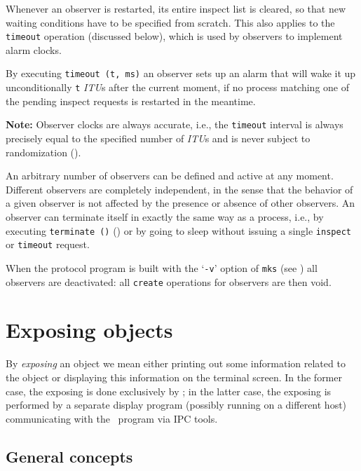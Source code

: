 Whenever an observer is restarted, its entire inspect list is cleared,
so that new waiting conditions have to be specified from scratch.
This also applies to the {\tt timeout} operation (discussed below),
which is used by observers to implement alarm clocks.

By executing
{\tt timeout~(t,~ms)}
an observer sets up an alarm that will wake
it up unconditionally {\tt t} {\em ITU\/}s after the current
moment, if no process matching one of the pending inspect requests
is restarted in the meantime.

\medskip

\noindent
{\bf Note:} Observer clocks are always accurate, i.e., the
{\tt timeout} interval is always precisely equal to the specified
number of {\em ITU\/}s and is never subject to randomization
().

\medskip

An arbitrary number of observers can be defined and active at any moment.
Different observers are completely independent, in the sense that the
behavior of a given observer is not affected by the presence or absence of
other observers.
An observer can terminate itself in exactly the same way as a
process, i.e.,
by executing {\tt terminate~()} ()
or by going to sleep without issuing a single
{\tt inspect} or {\tt timeout} request.

When the protocol program is built with the `{\tt -v}' option of {\tt mks}
(see )
all observers are deactivated: all {\tt create}
operations for observers are then void.

\section{Exposing objects}
\label{rm_ex}

By {\em exposing\/} an object we mean either printing out some information
related to the object or displaying this information on the terminal
screen.
In the former case, the exposing is done exclusively by \smurph; in the
latter case, the exposing is performed by a separate
display program (possibly running on a different host)
communicating with the \smurph\ program via IPC tools.

\subsection{General concepts}
\label{rm_ex_gc}

